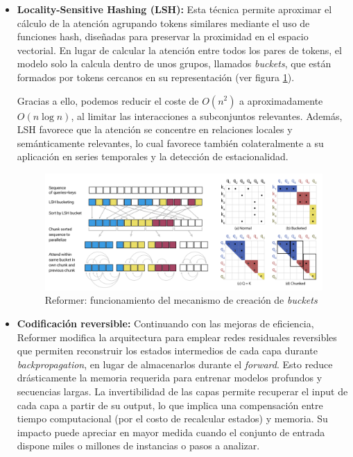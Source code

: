 \begin{itemize}
    \item \textbf{Locality-Sensitive Hashing (LSH):} Esta técnica permite aproximar el cálculo de la atención agrupando tokens similares mediante el uso de funciones hash, diseñadas para preservar la proximidad en el espacio vectorial. En lugar de calcular la atención entre todos los pares de tokens, el modelo solo la calcula dentro de unos grupos, llamados \textit{buckets}, que están formados por tokens cercanos en su representación (ver figura \ref{reformer}).

    Gracias a ello, podemos reducir el coste de \(O(n^2)\) a aproximadamente \(O(n \log n)\), al limitar las interacciones a subconjuntos relevantes. Además, LSH favorece que la atención se concentre en relaciones locales y semánticamente relevantes, lo cual favorece también colateralmente a su aplicación en series temporales y la detección de estacionalidad.

    \begin{figure}[!ht] %
        \centering
        \includegraphics[scale=0.225]{img/reformer}
        \caption{Reformer: funcionamiento del mecanismo de creación de \textit{buckets} \cite{kitaev2020reformerefficienttransformer}}
        \label{reformer}
    \end{figure}

    \item \textbf{Codificación reversible:} Continuando con las mejoras de eficiencia, Reformer modifica la arquitectura para emplear redes residuales reversibles que permiten reconstruir los estados intermedios de cada capa durante \textit{backpropagation}, en lugar de almacenarlos durante el \textit{forward}. Esto reduce drásticamente la memoria requerida para entrenar modelos profundos y secuencias largas. La invertibilidad de las capas permite recuperar el input de cada capa a partir de su output, lo que implica una compensación entre tiempo computacional (por el costo de recalcular estados) y memoria. Su impacto puede apreciar en mayor medida cuando el conjunto de entrada dispone miles o millones de instancias o pasos a analizar.

\end{itemize}

